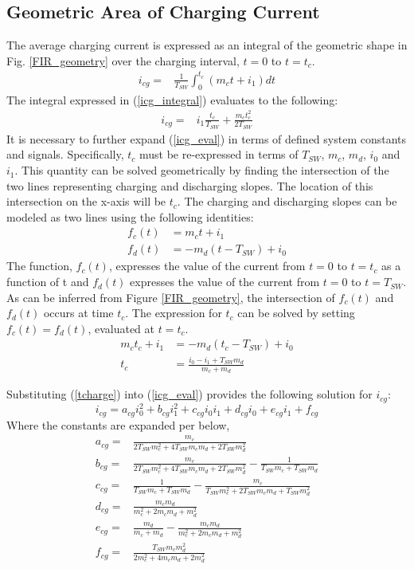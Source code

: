 \documentclass[conference]{IEEEtran}
\begin{document}
\subsection{Geometric Area of Charging Current}
The average charging current is expressed as an integral of the geometric shape in Fig. \ref{FIR_geometry} over the charging interval, $t=0$ to $t=t_c$.
\begin{align}
i_{cg} = & \frac{1}{T_{SW}}\int_0^{t_c}(m_ct+i_1)dt \label{icg_integral}
\end{align}
The integral expressed in (\ref{icg_integral}) evaluates to the following:
\begin{align}
i_{cg} = & i_1\frac{t_c}{T_{SW}}+\frac{m_ct_c^2}{2T_{SW}} \label{icg_eval}
\end{align}
It is necessary to further expand (\ref{icg_eval}) in terms of defined system constants and signals.  Specifically, \(t_c\) must be re-expressed in terms of $T_{SW}$, $m_c$, $m_d$, $i_0$ and $i_1$. This quantity can be solved geometrically by finding the intersection of the two lines representing charging and discharging slopes. The location of this intersection on the x-axis will be \(t_c\). The charging and discharging slopes can be modeled as two lines using the following identities:
\begin{align}
f_c(t) & = m_ct+i_1\\
f_d(t) & = -m_d(t-T_{SW})+i_0
\end{align}
The function, \(f_c(t)\), expresses the value of the current from \(t = 0\) to \(t = t_c\) as a function of t and \(f_d(t)\) expresses the value of the current from \(t = 0\) to \(t = T_{SW}\). As can be inferred from Figure \ref{FIR_geometry}, the intersection of $f_c(t)$ and $f_d(t)$ occurs at time \(t_c\). The expression for $t_c$ can be solved by setting $f_c(t) = f_d(t)$, evaluated at $t=t_c$.
\begin{align}
m_ct_c+i_1 & = -m_d(t_c-T_{SW})+i_0\\
t_c & = \frac{i_0-i_1+T_{SW}m_d}{m_c+m_d} \label{tcharge}
\end{align}

Substituting (\ref{tcharge}) into (\ref{icg_eval}) provides the following solution for \(i_{cg}\):
\begin{equation}
i_{cg} = a_{cg}i_0^2+b_{cg}i_1^2+c_{cg}i_0i_1+d_{cg}i_0+e_{cg}i_1+f_{cg} \label{i_cg_canon}
\end{equation}
Where the constants are expanded per below,
\begin{align*}
a_{cg} = & \frac{m_c}{2T_{SW}m_c^2+4T_{SW}m_cm_d+2T_{SW}m_d^2}\nonumber\\
b_{cg} = & \frac{m_c}{2T_{SW}m_c^2+4T_{SW}m_cm_d+2T_{SW}m_d^2}-\frac{1}{T_{SW}m_c+T_{SW}m_d}\nonumber\\
c_{cg} = & \frac{1}{T_{SW}m_c+T_{SW}m_d}-\frac{m_c}{T_{SW}m_c^2+2T_{SW}m_cm_d+T_{SW}m_d^2}\nonumber\\
d_{cg} = & \frac{m_cm_d}{m_c^2+2m_cm_d+m_d^2}\nonumber\\
e_{cg} = & \frac{m_d}{m_c+m_d}-\frac{m_cm_d}{m_c^2+2m_cm_d+m_d^2}\nonumber\\
f_{cg} = & \frac{T_{SW}m_c m_d^2}{2m_c^2+4m_cm_d+2m_d^2}\nonumber\\
\end{align*}
\end{document}
